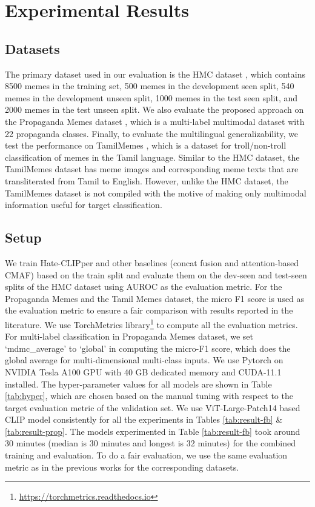 \documentclass[11pt]{article}
\begin{document}
\section{Experimental Results}
\label{sec:exp}

\subsection{Datasets}
The primary dataset used in our evaluation is the HMC dataset \cite{kiela2020hateful}, which contains 8500 memes in the training set, 500 memes in the development seen split, 540 memes in the development unseen split, 1000 memes in the test seen split, and 2000 memes in the test unseen split. We also evaluate the proposed approach on the Propaganda Memes dataset \citet{sharma2022detecting}, which is a multi-label multimodal dataset with 22 propaganda classes. Finally, to evaluate the multilingual generalizability, we test the performance on TamilMemes \cite{suryawanshi-etal-2020-dataset}, which is a dataset for troll/non-troll classification of memes in the Tamil language. Similar to the HMC dataset, the TamilMemes dataset has meme images and corresponding meme texts that are transliterated from Tamil to English. However, unlike the HMC dataset, the TamilMemes dataset is not compiled with the motive of making only multimodal information useful for target classification.  

\subsection{Setup}
We train Hate-CLIPper and other baselines (concat fusion and attention-based CMAF) based on the train split and evaluate them on the dev-seen and test-seen splits of the HMC dataset using AUROC as the evaluation metric. For the Propaganda Memes and the Tamil Memes dataset, the micro F1 score is used as the evaluation metric to ensure a fair comparison with results reported in the literature. We use TorchMetrics library\footnote{\url{https://torchmetrics.readthedocs.io}} to compute all the evaluation metrics. For multi-label classification in Propaganda Memes dataset, we set `mdmc\_average' to `global' in computing the micro-F1 score, which does the global average for multi-dimensional multi-class inputs. We use Pytorch on NVIDIA Tesla A100 GPU with 40 GB dedicated memory and CUDA-11.1 installed. The hyper-parameter values for all models are shown in Table \ref{tab:hyper}, which are chosen based on the manual tuning with respect to the target evaluation metric of the validation set. We use ViT-Large-Patch14 based CLIP model consistently for all the experiments in Tables  \ref{tab:result-fb} \& \ref{tab:result-prop}. The models experimented in Table \ref{tab:result-fb} took around 30 minutes (median is 30 minutes and longest is 32 minutes) for the combined training and evaluation. To do a fair evaluation, we use the same evaluation metric as in the previous works for the corresponding datasets.
\end{document}
